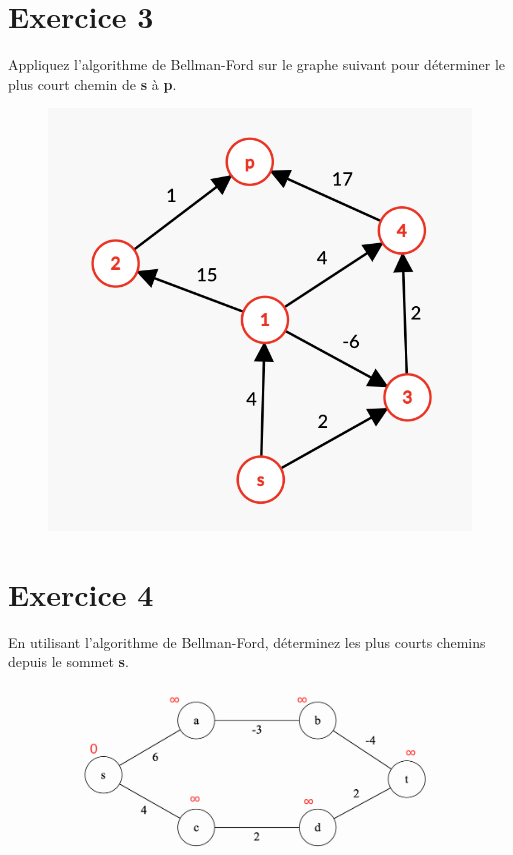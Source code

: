 \documentclass[10pt,a4paper]{article}
\begin{document}
\newpage 
\section*{Exercice 3}
Appliquez l'algorithme de Bellman-Ford sur le graphe suivant pour déterminer le plus court chemin de \textbf{s} à \textbf{p}.

\begin{figure}[h!]
    \centering
    \includegraphics[scale=0.55]{BF-1.png}
\end{figure}

\section*{Exercice 4}
En utilisant l'algorithme de Bellman-Ford, déterminez les plus courts chemins depuis le sommet \textbf{s}.
\begin{figure}[h!]
    \centering
    \includegraphics[scale=0.35]{BF-2.png}
    \label{fig:my_label}
\end{figure}
\end{document}
